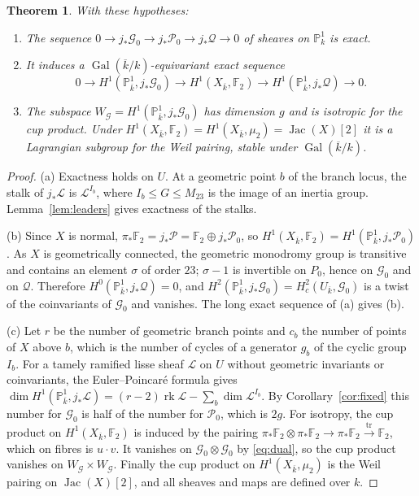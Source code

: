 \documentclass[11pt]{amsart}
\newtheorem{theorem}{Theorem}[section]
\theoremstyle{definition}
\newcommand{\FF}{\mathbb{F}}
\newcommand{\PP}{\mathbb{P}}
\newcommand{\kbar}{\overline{k}}
\newcommand{\Gal}{\operatorname{Gal}}
\newcommand{\Jac}{\operatorname{Jac}}
\newcommand{\M}{M_{23}}
\newcommand{\cG}{\mathcal{G}}
\newcommand{\cP}{\mathcal{P}}
\newcommand{\cQ}{\mathcal{Q}}
\begin{document}
\begin{theorem}\label{thm:lagrangian}
With these hypotheses:
\begin{enumerate}[label=\textup{(\alph*)}]
\item The sequence $0\to j_*\cG_0\to j_*\cP_0\to j_*\cQ\to0$ of sheaves on $\PP^1_k$ is exact.
\item It induces a $\Gal(\kbar/k)$-equivariant exact sequence
\[
0\to H^1(\PP^1_{\kbar},j_*\cG_0)\to H^1(X_{\kbar},\FF_2)\to H^1(\PP^1_{\kbar},j_*\cQ)\to0 .
\]
\item The subspace $W_\cG=H^1(\PP^1_{\kbar},j_*\cG_0)$ has dimension $g$ and is isotropic for the cup product. Under $H^1(X_{\kbar},\FF_2)=H^1(X_{\kbar},\mu_2)=\Jac(X)[2]$ it is a Lagrangian subgroup for the Weil pairing, stable under $\Gal(\kbar/k)$.
\end{enumerate}
\end{theorem}
\begin{proof}
(a) Exactness holds on $U$. At a geometric point $b$ of the branch locus, the stalk of $j_*\mathcal L$ is $\mathcal L^{I_b}$, where $I_b\le G\le\M$ is the image of an inertia group. Lemma~\ref{lem:leaders} gives exactness of the stalks.

(b) Since $X$ is normal, $\pi_*\FF_2=j_*\cP=\FF_2\oplus j_*\cP_0$, so $H^1(X_{\kbar},\FF_2)=H^1(\PP^1_{\kbar},j_*\cP_0)$. As $X$ is geometrically connected, the geometric monodromy group is transitive and contains an element $\sigma$ of order $23$; $\sigma-1$ is invertible on $P_0$, hence on $\cG_0$ and on $\cQ$. Therefore $H^0(\PP^1_{\kbar},j_*\cQ)=0$, and $H^2(\PP^1_{\kbar},j_*\cG_0)=H^2_c(U_{\kbar},\cG_0)$ is a twist of the coinvariants of $\cG_0$ and vanishes. The long exact sequence of (a) gives (b).

(c) Let $r$ be the number of geometric branch points and $c_b$ the number of points of $X$ above $b$, which is the number of cycles of a generator $g_b$ of the cyclic group $I_b$. For a tamely ramified lisse sheaf $\mathcal L$ on $U$ without geometric invariants or coinvariants, the Euler--Poincar\'e formula gives $\dim H^1(\PP^1_{\kbar},j_*\mathcal L)=(r-2)\operatorname{rk}\mathcal L-\sum_b\dim\mathcal L^{I_b}$. By Corollary~\ref{cor:fixed} this number for $\cG_0$ is half of the number for $\cP_0$, which is $2g$. For isotropy, the cup product on $H^1(X_{\kbar},\FF_2)$ is induced by the pairing $\pi_*\FF_2\otimes\pi_*\FF_2\to\pi_*\FF_2\xrightarrow{\operatorname{tr}}\FF_2$, which on fibres is $u\cdot v$. It vanishes on $\cG_0\otimes\cG_0$ by \eqref{eq:dual}, so the cup product vanishes on $W_\cG\times W_\cG$. Finally the cup product on $H^1(X_{\kbar},\mu_2)$ is the Weil pairing on $\Jac(X)[2]$, and all sheaves and maps are defined over $k$.
\end{proof}
\end{document}
